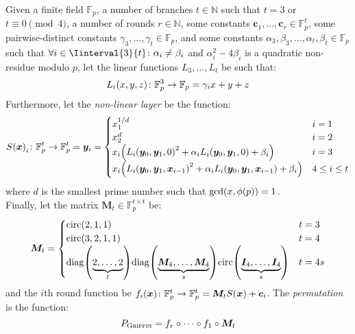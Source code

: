\begin{definition}\label{def:griffin}
  Given a finite field \(\mathbb{F}_p\), a number of branches \(t \in \mathbb{N}\) such that 
  \(t = 3\) or \(t \equiv 0 \pmod{4}\), a number of rounds \(r \in \mathbb{N}\), some constants 
  \(\bm{c}_{1}, \dots, \bm{c}_{r} \in \mathbb{F}_{p}^{t}\), some pairwise-distinct 
  constants \(\gamma_3, \dots, \gamma_t \in \mathbb{F}_{p}\), and some constants 
  \(\alpha_3, \beta_3, \dots, \alpha_t, \beta_t \in \mathbb{F}_{p}\) such that 
  \(\forall i \in \Iinterval{3}{t}\colon \alpha_i \neq \beta_i\) and 
  \(\alpha_{i}^{2} - 4\beta_{i}\) is a quadratic non-residue modulo \(p\), 
  let the linear functions \(L_3, \dots, L_t\) be such that:
  \[\call{L_i}{x, y, z}\colon \mathbb{F}_p^3 \to \mathbb{F}_p = \gamma_{i}x + y + z\]
  Furthermore, let the \emph{non-linear layer} be the function:
  \[
    \call{S}{\bm{x}}_i\colon \mathbb{F}_{p}^{t} \to \mathbb{F}_{p}^{t} = \bm{y}_i =
    \begin{cases}
      x_{1}^{1/d}                                                         & i = 1         \\
      x_{2}^{d}                                                           & i = 2         \\
      x_{i}\Parens*{\call{L_i}{\bm{y}_0, \bm{y}_1, 0}^{2} + 
      \alpha_{i}\call{L_i}{\bm{y}_0, \bm{y}_1, 0} + \beta_i}              & i = 3         \\
      x_{i}\Parens*{\call{L_i}{\bm{y}_0, \bm{y}_1, \bm{x}_{i-1}}^{2} + 
      \alpha_{i}\call{L_i}{\bm{y}_0, \bm{y}_1, \bm{x}_{i-1}} + \beta_i}   & 4 \le i \le t
    \end{cases}
  \]
  where \(d\) is the smallest prime number such that \(\call{\gcd}{x, \call{\totient}{p}} = 1\).\\
  Finally, let the matrix \(\bm{M}_t \in \mathbb{F}_p^{t \times t}\) be:
  \[
    \bm{M}_t = 
    \begin{cases}
      \call{\circulant}{2, 1, 1} & t = 3 \\  
      \call{\circulant}{3, 2, 1, 1} & t = 4 \\
      \call{\diag}{\underbrace{2, \dots, 2}_{t}}
      \call{\diag}{\underbrace{\bm{M}_{4}, \dots, \bm{M}_4}_{s}}
      \call{\circulant}{\underbrace{\bm{I}_4, \dots, \bm{I}_4}_{s}}
      & t = 4s
    \end{cases}
  \]
  and the \(i\)th round function be
  \(\call{f_i}{\bm{x}}\colon \mathbb{F}_{p}^{t} \to \mathbb{F}_{p}^{t} = 
    \bm{M}_{t}\call{S}{\bm{x}} + \bm{c}_i\).
  The \emph{\Griffin{} permutation} is the function:
  \[
    P_{\textnormal{\textsc{Griffin}}} = f_{r} \circ \cdots \circ f_{1} \circ \bm{M}_{t}
  \]
\end{definition}

